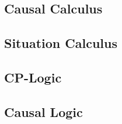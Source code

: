 \documentclass[11pt,a4paper]{book}
\theoremstyle{definition}
\theoremstyle{definition}
\theoremstyle{definition}
\theoremstyle{remark}
\begin{document}
\subsection{Causal Calculus}



\subsection{Situation Calculus}


\subsection{CP-Logic}
\label{subsec:cp-logic}


\subsection{Causal Logic}
\label{subsec:causal-logic-mccain}
\end{document}
